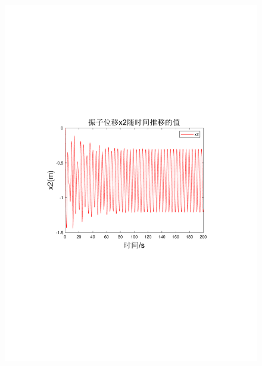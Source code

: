 \documentclass[12pt,utf8]{article}
\begin{document}
\begin{figure}[htbp]
\begin{minipage}{0.45\linewidth}
		\includegraphics[width=0.9\linewidth]{figures/T1-2振子位移x2.pdf}
		\label{chutian3}%
	\end{minipage}
	\begin{minipage}{0.45\linewidth}

\end{minipage}
\end{figure}
\end{document}
